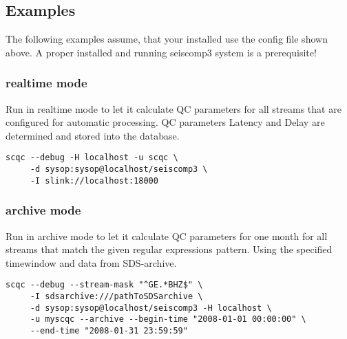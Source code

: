\subsection{Examples}
\noindent
The following examples assume, that your installed  use the config file  shown above. A proper installed and running seiscomp3 system is a prerequisite!

\subsubsection{realtime mode}
\noindent
Run  in realtime mode to let it calculate QC parameters for all streams that are configured for automatic processing. QC parameters Latency and Delay are determined and stored into the database.
\begin{small}
\begin{verbatim}
scqc --debug -H localhost -u scqc \
     -d sysop:sysop@localhost/seiscomp3 \
     -I slink://localhost:18000
\end{verbatim}
\end{small}

\subsubsection{archive mode}
Run  in archive mode to let it calculate QC parameters for one month for all streams that match the given regular expressions pattern. Using the specified timewindow and data from SDS-archive.
\begin{small}
\begin{verbatim}
scqc --debug --stream-mask "^GE.*BHZ$" \
     -I sdsarchive:///pathToSDSarchive \
     -d sysop:sysop@localhost/seiscomp3 -H localhost \
     -u myscqc --archive --begin-time "2008-01-01 00:00:00" \
     --end-time "2008-01-31 23:59:59"
\end{verbatim}
\end{small}
